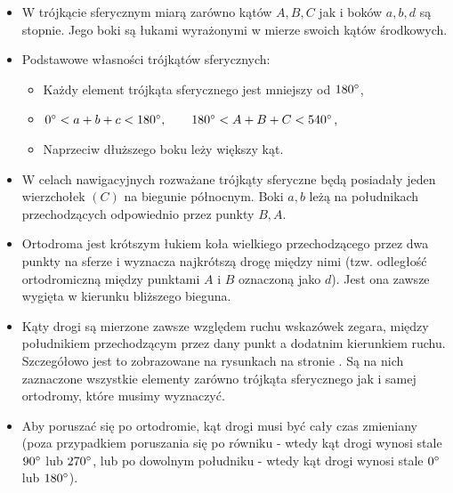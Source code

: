 \documentclass[10pt, twoside, fleqn]{article}
\begin{document}
\begin{itemize}
					
				\item 	W trójkącie sferycznym miarą zarówno kątów $A,B,C$ jak i 
						boków $a,b,d$ są stopnie. Jego boki są łukami
						wyrażonymi w mierze swoich kątów środkowych.
				
				\vspace{-2pt}		
				\item 	Podstawowe własności trójkątów sferycznych:
				\vspace{-3pt}
				\begin{itemize}	
					\item	Każdy element trójkąta sferycznego jest mniejszy 
							od $180\degree$,
					\item	$	0\degree < a+b+c < 180\degree, 
									\hspace{20pt}
								180\degree < A+B+C < 540\degree		$,
					\item	Naprzeciw dłuższego boku leży większy kąt.
				\end{itemize}
				
				\vspace{-2pt}		
				\item	W celach nawigacyjnych rozważane trójkąty sferyczne będą
						posiadały jeden wierzchołek $(C)$ na biegunie północnym.
						Boki $a,b$ leżą na południkach przechodzących odpowiednio
						przez punkty $B,A$.
				
				\vspace{-2pt}
				\item	Ortodroma jest krótszym łukiem koła wielkiego przechodzącego
						przez dwa punkty na sferze i wyznacza najkrótszą drogę między
						nimi (tzw. odległość ortodromiczną między punktami $A$ i $B$
						oznaczoną jako $d$).
						Jest ona zawsze wygięta w kierunku bliższego bieguna.
				
				\vspace{-2pt}		
				\item	Kąty drogi są mierzone zawsze względem ruchu wskazówek
						zegara, między południkiem przechodzącym przez dany punkt
						a dodatnim kierunkiem ruchu. Szczegółowo jest to
						zobrazowane na rysunkach na stronie \pageref{fig:e-w}.
						Są na nich zaznaczone wszystkie elementy zarówno
						trójkąta sferycznego jak i samej ortodromy,
						które musimy wyznaczyć.	
				
				\vspace{-2pt}	
				\item	Aby poruszać się po ortodromie, kąt drogi musi być cały
						czas zmieniany (poza przypadkiem poruszania się po równiku -
						wtedy kąt drogi wynosi stale $90\degree$ lub $270\degree$, 
						lub po dowolnym południku - wtedy kąt drogi wynosi stale 
						$0\degree$ lub $180\degree$).
				

\end{itemize}
\end{document}
